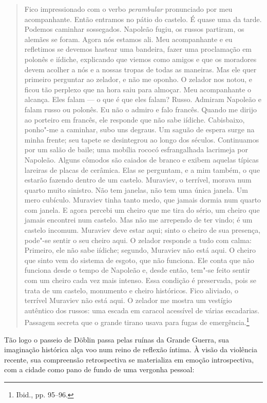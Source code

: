 \begin{quote}
Fico impressionado com o verbo \textit{perambular} pronunciado por meu
acompanhante. Então entramos no pátio do castelo. É quase uma da tarde.
Podemos caminhar sossegados. Napoleão fugiu, os russos partiram, os
alemães se foram. Agora nós estamos ali. Meu acompanhante e eu
refletimos se devemos hastear uma bandeira, fazer uma proclamação em
polonês e iídiche, explicando que viemos como amigos e que os moradores
devem acolher a nós e a nossas tropas de todas as maneiras. Mas ele quer
primeiro perguntar ao zelador, e não me oponho. O zelador nos notou, e
ficou tão perplexo que na hora saiu para almoçar. Meu acompanhante o
alcança. Eles falam --- o que é que eles falam? Russo. Admiram Napoleão e
falam russo ou polonês. Eu não o admiro e falo francês. Quando me dirijo
ao porteiro em francês, ele responde que não sabe iídiche. Cabisbaixo,
ponho"-me a caminhar, subo uns degraus. Um saguão de espera surge na
minha frente; seu tapete se desintegrou ao longo dos séculos.
Continuamos por um salão de baile; uma mobília rococó esfrangalhada
lacrimeja por Napoleão. Alguns cômodos são caiados de branco e exibem
aquelas típicas lareiras de placas de cerâmica. Elas se perguntam, e a
mim também, o que estarão fazendo dentro de um castelo. Muraviev, o
terrível, morava num quarto muito sinistro. Não tem janelas, não tem uma
única janela. Um mero cubículo. Muraviev tinha tanto medo, que jamais
dormia num quarto com janela. E agora percebi um cheiro que me tira do
sério, um cheiro que jamais encontrei num castelo. Mas não me arrependo
de ter vindo; é um castelo incomum. Muraviev deve estar aqui; sinto o
cheiro de sua presença, pode"-se sentir o seu cheiro aqui. O zelador
responde a tudo com calma: Primeiro, ele não sabe iídiche; segundo,
Muraviev não está aqui. O cheiro que sinto vem do sistema de esgoto, que
não funciona. Ele conta que não funciona desde o tempo de Napoleão e,
desde então, tem"-se feito sentir com um cheiro cada vez mais intenso.
Essa condição é preservada, pois se trata de um castelo, monumento e
cheiro históricos. Fico aliviado, o terrível Muraviev não está aqui. O
zelador me mostra um vestígio autêntico dos russos: uma escada em
caracol acessível de várias escadarias. Passagem secreta que o grande
tirano usava para fugas de emergência.\footnote{Ibid., pp. 95--96.}
\end{quote}

Tão logo o passeio de Döblin passa pelas ruínas da Grande Guerra, sua
imaginação histórica alça voo num reino de reflexão íntima. À visão da
violência recente, sua compreensão retrospectiva se materializa em
emoção introspectiva, com a cidade como pano de fundo de uma vergonha
pessoal:


